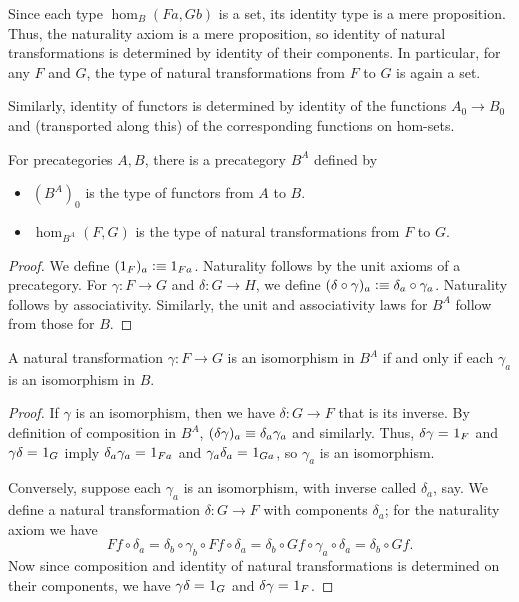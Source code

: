Since each type $\hom_B(Fa,Gb)$ is a set, its identity type is a mere proposition.
Thus, the naturality axiom is a mere proposition, so identity of natural transformations is determined by identity of their components.
In particular, for any $F$ and $G$, the type of natural transformations from $F$ to $G$ is again a set.

Similarly, identity of functors is determined by identity of the functions $A_0\to B_0$ and (transported along this) of the corresponding functions on hom-sets.

\begin{defn}\label{ct:functor-precat}
  For precategories $A,B$, there is a precategory $B^A$ defined by
  \begin{itemize}
  \item $(B^A)_0$ is the type of functors from $A$ to $B$.
  \item $\hom_{B^A}(F,G)$ is the type of natural transformations from $F$ to $G$.
  \end{itemize}
\end{defn}
\begin{proof}
  We define $(1_F)_a\vcentcolon\equiv 1_{Fa}$.
  Naturality follows by the unit axioms of a precategory.
  For $\gamma:F\to G$ and $\delta:G\to H$, we define $(\delta\circ\gamma)_a\vcentcolon\equiv \delta_a\circ \gamma_a$.
  Naturality follows by associativity.
  Similarly, the unit and associativity laws for $B^A$ follow from those for $B$.
\end{proof}

\begin{lem}\label{ct:natiso}
  A natural transformation $\gamma:F\to G$ is an isomorphism in $B^A$ if and only if each $\gamma_a$ is an isomorphism in $B$.
\end{lem}
\begin{proof}
  If $\gamma$ is an isomorphism, then we have $\delta:G\to F$ that is its inverse.
  By definition of composition in $B^A$, $(\delta\gamma)_a\equiv \delta_a\gamma_a$ and similarly.
  Thus, $\delta\gamma =_{} 1_F$ and $\gamma\delta =_{} 1_G$ imply $\delta_a\gamma_a =_{} 1_{Fa}$ and $\gamma_a\delta_a =_{} 1_{Ga}$, so $\gamma_a$ is an isomorphism.

  Conversely, suppose each $\gamma_a$ is an isomorphism, with inverse called $\delta_a$, say.
We define a natural transformation $\delta:G\to F$ with components $\delta_a$; for the naturality axiom we have
  \[ Ff\circ \delta_a = \delta_b\circ \gamma_b\circ Ff \circ \delta_a = \delta_b\circ Gf\circ \gamma_a\circ \delta_a = \delta_b\circ Gf. \]
  Now since composition and identity of natural transformations is determined on their components, we have $\gamma\delta =_{} 1_G$ and $\delta\gamma =_{} 1_F$.
\end{proof}

